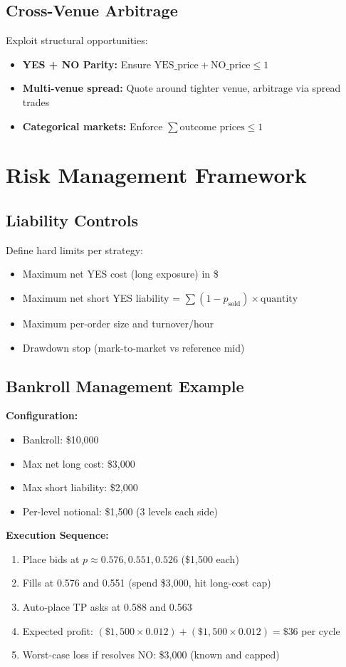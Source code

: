 \documentclass[11pt]{article}
\begin{document}
\subsection{Cross-Venue Arbitrage}

Exploit structural opportunities:
\begin{itemize}
    \item \textbf{YES + NO Parity:} Ensure $\text{YES\_price} + \text{NO\_price} \leq 1$
    \item \textbf{Multi-venue spread:} Quote around tighter venue, arbitrage via spread trades
    \item \textbf{Categorical markets:} Enforce $\sum \text{outcome prices} \leq 1$
\end{itemize}

\section{Risk Management Framework}

\subsection{Liability Controls}
Define hard limits per strategy:
\begin{itemize}
    \item Maximum net YES cost (long exposure) in \$
    \item Maximum net short YES liability = $\sum(1 - p_{\text{sold}}) \times \text{quantity}$
    \item Maximum per-order size and turnover/hour
    \item Drawdown stop (mark-to-market vs reference mid)
\end{itemize}

\subsection{Bankroll Management Example}
\textbf{Configuration:}
\begin{itemize}
    \item Bankroll: \$10,000
    \item Max net long cost: \$3,000
    \item Max short liability: \$2,000
    \item Per-level notional: \$1,500 (3 levels each side)
\end{itemize}

\textbf{Execution Sequence:}
\begin{enumerate}
    \item Place bids at $p \approx 0.576, 0.551, 0.526$ (\$1,500 each)
    \item Fills at 0.576 and 0.551 (spend \$3,000, hit long-cost cap)
    \item Auto-place TP asks at 0.588 and 0.563
    \item Expected profit: $(\$1,500 \times 0.012) + (\$1,500 \times 0.012) = \$36$ per cycle
    \item Worst-case loss if resolves NO: \$3,000 (known and capped)
\end{enumerate}
\end{document}
